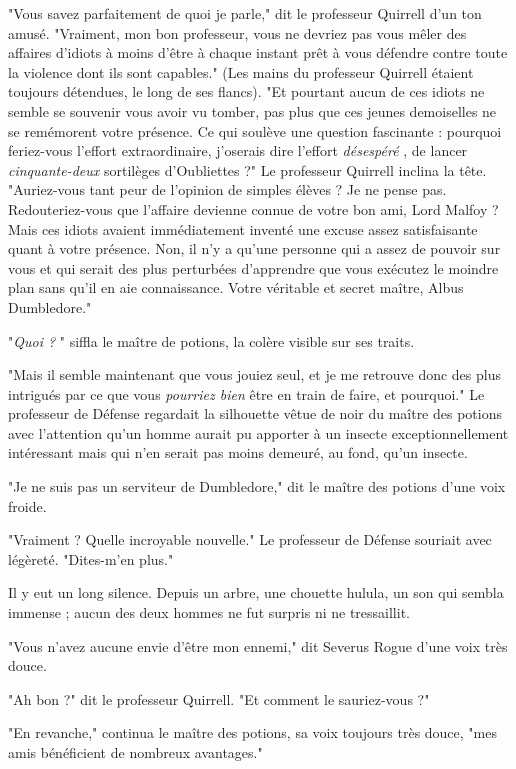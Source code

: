 "Vous savez parfaitement de quoi je parle," dit le professeur Quirrell d'un ton amusé. "Vraiment, mon bon professeur, vous ne devriez pas vous mêler des affaires d'idiots à moins d'être à chaque instant prêt à vous défendre contre toute la violence dont ils sont capables." (Les mains du professeur Quirrell étaient toujours détendues, le long de ses flancs). "Et pourtant aucun de ces idiots ne semble se souvenir vous avoir vu tomber, pas plus que ces jeunes demoiselles ne se remémorent votre présence. Ce qui soulève une question fascinante : pourquoi feriez-vous l'effort extraordinaire, j'oserais dire l'effort \emph{désespéré} , de lancer \emph{cinquante-deux}  sortilèges d'Oubliettes ?" Le professeur Quirrell inclina la tête. "Auriez-vous tant peur de l'opinion de simples élèves ? Je ne pense pas. Redouteriez-vous que l'affaire devienne connue de votre bon ami, Lord Malfoy ? Mais ces idiots avaient immédiatement inventé une excuse assez satisfaisante quant à votre présence. Non, il n'y a qu'une personne qui a assez de pouvoir sur vous et qui serait des plus perturbées d'apprendre que vous exécutez le moindre plan sans qu'il en aie connaissance. Votre véritable et secret maître, Albus Dumbledore."

"\emph{Quoi ?} " siffla le maître de potions, la colère visible sur ses traits.

"Mais il semble maintenant que vous jouiez seul, et je me retrouve donc des plus intrigués par ce que vous \emph{pourriez bien}  être en train de faire, et pourquoi." Le professeur de Défense regardait la silhouette vêtue de noir du maître des potions avec l'attention qu'un homme aurait pu apporter à un insecte exceptionnellement intéressant mais qui n'en serait pas moins demeuré, au fond, qu'un insecte.

"Je ne suis pas un serviteur de Dumbledore," dit le maître des potions d'une voix froide.

"Vraiment ? Quelle incroyable nouvelle." Le professeur de Défense souriait avec légèreté. "Dites-m'en plus."

Il y eut un long silence. Depuis un arbre, une chouette hulula, un son qui sembla immense ; aucun des deux hommes ne fut surpris ni ne tressaillit.

"Vous n'avez aucune envie d'être mon ennemi," dit Severus Rogue d'une voix très douce.

"Ah bon ?" dit le professeur Quirrell. "Et comment le sauriez-vous ?"

"En revanche," continua le maître des potions, sa voix toujours très douce, "mes amis bénéficient de nombreux avantages."

